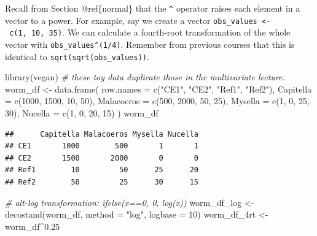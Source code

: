 \documentclass[
  11pt,
  a4paper,
]{book}
\newenvironment{Shaded}{\begin{snugshade}}{\end{snugshade}}
\newcommand{\AttributeTok}[1]{\textcolor[rgb]{0.77,0.63,0.00}{#1}}
\newcommand{\CommentTok}[1]{\textcolor[rgb]{0.56,0.35,0.01}{\textit{#1}}}
\newcommand{\DecValTok}[1]{\textcolor[rgb]{0.00,0.00,0.81}{#1}}
\newcommand{\FloatTok}[1]{\textcolor[rgb]{0.00,0.00,0.81}{#1}}
\newcommand{\FunctionTok}[1]{\textcolor[rgb]{0.00,0.00,0.00}{#1}}
\newcommand{\NormalTok}[1]{#1}
\newcommand{\OtherTok}[1]{\textcolor[rgb]{0.56,0.35,0.01}{#1}}
\newcommand{\SpecialCharTok}[1]{\textcolor[rgb]{0.00,0.00,0.00}{#1}}
\newcommand{\StringTok}[1]{\textcolor[rgb]{0.31,0.60,0.02}{#1}}
\begin{document}
Recall from Section @ref\{normal\} that the \texttt{\^{}} operator raises each element in a vector to a power. For example, say we create a vector \texttt{obs\_values\ \textless{}-\ c(1,\ 10,\ 35)}. We can calculate a fourth-root transformation of the whole vector with \texttt{obs\_values\^{}(1/4)}. Remember from previous courses that this is identical to \texttt{sqrt(sqrt(obs\_values))}.

\begin{Shaded}
\begin{Highlighting}[]
\FunctionTok{library}\NormalTok{(vegan) }
\CommentTok{\# these toy data duplicate those in the multivariate lecture.}
\NormalTok{worm\_df }\OtherTok{\textless{}{-}} \FunctionTok{data.frame}\NormalTok{(}
  \AttributeTok{row.names =} \FunctionTok{c}\NormalTok{(}\StringTok{"CE1"}\NormalTok{, }\StringTok{"CE2"}\NormalTok{, }\StringTok{"Ref1"}\NormalTok{, }\StringTok{"Ref2"}\NormalTok{),}
  \AttributeTok{Capitella =} \FunctionTok{c}\NormalTok{(}\DecValTok{1000}\NormalTok{, }\DecValTok{1500}\NormalTok{, }\DecValTok{10}\NormalTok{, }\DecValTok{50}\NormalTok{),}
  \AttributeTok{Malacoeros =} \FunctionTok{c}\NormalTok{(}\DecValTok{500}\NormalTok{, }\DecValTok{2000}\NormalTok{, }\DecValTok{50}\NormalTok{, }\DecValTok{25}\NormalTok{),}
  \AttributeTok{Mysella =} \FunctionTok{c}\NormalTok{(}\DecValTok{1}\NormalTok{, }\DecValTok{0}\NormalTok{, }\DecValTok{25}\NormalTok{, }\DecValTok{30}\NormalTok{),}
  \AttributeTok{Nucella =} \FunctionTok{c}\NormalTok{(}\DecValTok{1}\NormalTok{, }\DecValTok{0}\NormalTok{, }\DecValTok{20}\NormalTok{, }\DecValTok{15}\NormalTok{)}
\NormalTok{)}
\NormalTok{worm\_df}
\end{Highlighting}
\end{Shaded}

\begin{verbatim}
##      Capitella Malacoeros Mysella Nucella
## CE1       1000        500       1       1
## CE2       1500       2000       0       0
## Ref1        10         50      25      20
## Ref2        50         25      30      15
\end{verbatim}

\begin{Shaded}
\begin{Highlighting}[]
\CommentTok{\# alt{-}log transformation: ifelse(x==0, 0, log(x))}
\NormalTok{worm\_df\_log }\OtherTok{\textless{}{-}} \FunctionTok{decostand}\NormalTok{(worm\_df, }\AttributeTok{method =} \StringTok{"log"}\NormalTok{, }\AttributeTok{logbase =} \DecValTok{10}\NormalTok{)}
\NormalTok{worm\_df\_4rt }\OtherTok{\textless{}{-}}\NormalTok{ worm\_df}\SpecialCharTok{\^{}}\FloatTok{0.25}
\end{Highlighting}
\end{Shaded}
\end{document}
